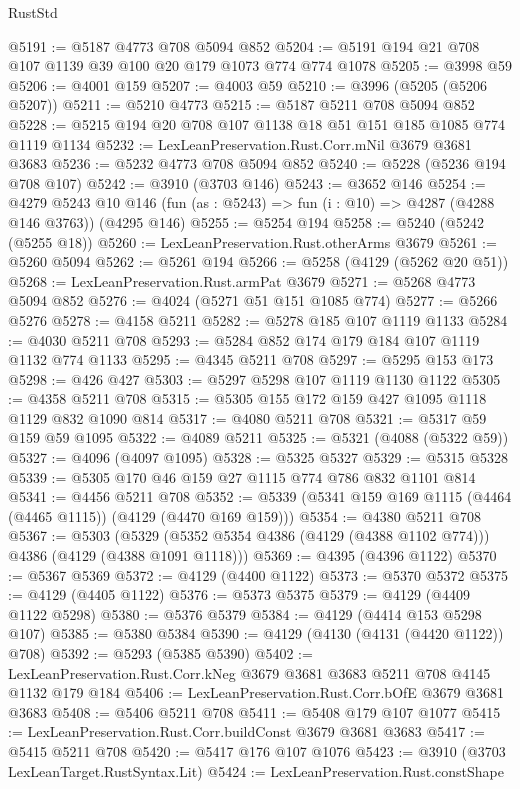 \begin{lexlean}{RustStd}
\begin{coremodule}
@5191 := @5187 @4773 @708 @5094 @852
@5204 := @5191 @194 @21 @708 @107 @1139 @39 @100 @20 @179 @1073 @774 @774 @1078
@5205 := @3998 @59
@5206 := @4001 @159
@5207 := @4003 @59
@5210 := @3996 (@5205 (@5206 @5207))
@5211 := @5210 @4773
@5215 := @5187 @5211 @708 @5094 @852
@5228 := @5215 @194 @20 @708 @107 @1138 @18 @51 @151 @185 @1085 @774 @1119 @1134
@5232 := LexLeanPreservation.Rust.Corr.mNil @3679 @3681 @3683
@5236 := @5232 @4773 @708 @5094 @852
@5240 := @5228 (@5236 @194 @708 @107)
@5242 := @3910 (@3703 @146)
@5243 := @3652 @146
@5254 := @4279
    @5243
    @10
    @146
    (fun (as : @5243) => fun (i : @10) => @4287 (@4288 @146 @3763))
    (@4295 @146)
@5255 := @5254 @194
@5258 := @5240 (@5242 (@5255 @18))
@5260 := LexLeanPreservation.Rust.otherArms @3679
@5261 := @5260 @5094
@5262 := @5261 @194
@5266 := @5258 (@4129 (@5262 @20 @51))
@5268 := LexLeanPreservation.Rust.armPat @3679
@5271 := @5268 @4773 @5094 @852
@5276 := @4024 (@5271 @51 @151 @1085 @774)
@5277 := @5266 @5276
@5278 := @4158 @5211
@5282 := @5278 @185 @107 @1119 @1133
@5284 := @4030 @5211 @708
@5293 := @5284 @852 @174 @179 @184 @107 @1119 @1132 @774 @1133
@5295 := @4345 @5211 @708
@5297 := @5295 @153 @173
@5298 := @426 @427
@5303 := @5297 @5298 @107 @1119 @1130 @1122
@5305 := @4358 @5211 @708
@5315 := @5305 @155 @172 @159 @427 @1095 @1118 @1129 @832 @1090 @814
@5317 := @4080 @5211 @708
@5321 := @5317 @59 @159 @59 @1095
@5322 := @4089 @5211
@5325 := @5321 (@4088 (@5322 @59))
@5327 := @4096 (@4097 @1095)
@5328 := @5325 @5327
@5329 := @5315 @5328
@5339 := @5305 @170 @46 @159 @27 @1115 @774 @786 @832 @1101 @814
@5341 := @4456 @5211 @708
@5352 := @5339 (@5341 @159 @169 @1115 (@4464 (@4465 @1115)) (@4129 (@4470 @169 @159)))
@5354 := @4380 @5211 @708
@5367 := @5303
    (@5329 (@5352 @5354 @4386 (@4129 (@4388 @1102 @774))) @4386 (@4129 (@4388 @1091 @1118)))
@5369 := @4395 (@4396 @1122)
@5370 := @5367 @5369
@5372 := @4129 (@4400 @1122)
@5373 := @5370 @5372
@5375 := @4129 (@4405 @1122)
@5376 := @5373 @5375
@5379 := @4129 (@4409 @1122 @5298)
@5380 := @5376 @5379
@5384 := @4129 (@4414 @153 @5298 @107)
@5385 := @5380 @5384
@5390 := @4129 (@4130 (@4131 (@4420 @1122)) @708)
@5392 := @5293 (@5385 @5390)
@5402 := LexLeanPreservation.Rust.Corr.kNeg @3679 @3681 @3683 @5211 @708 @4145 @1132 @179 @184
@5406 := LexLeanPreservation.Rust.Corr.bOfE @3679 @3681 @3683
@5408 := @5406 @5211 @708
@5411 := @5408 @179 @107 @1077
@5415 := LexLeanPreservation.Rust.Corr.buildConst @3679 @3681 @3683
@5417 := @5415 @5211 @708
@5420 := @5417 @176 @107 @1076
@5423 := @3910 (@3703 LexLeanTarget.RustSyntax.Lit)
@5424 := LexLeanPreservation.Rust.constShape

\end{coremodule}
\end{lexlean}
